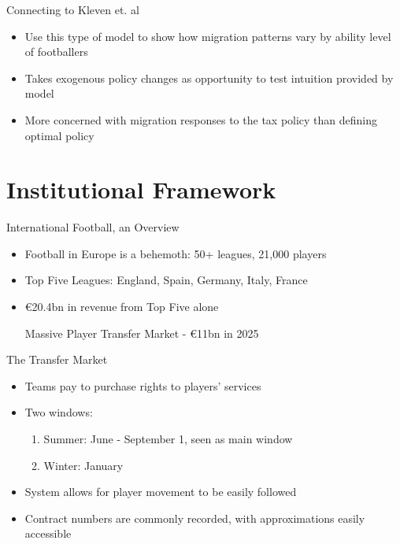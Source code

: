 \documentclass[aspectratio=169,professionalfonts]{beamer}
\begin{document}
\begin{frame}{Connecting to Kleven et. al}
  \begin{itemize}
    \item Use this type of model to show how migration patterns vary by ability level of footballers
    \item Takes exogenous policy changes as opportunity to test intuition provided by model
    \item More concerned with migration responses to the tax policy than defining optimal policy
  \end{itemize}
\end{frame}

\section{Institutional Framework}

\begin{frame}{International Football, an Overview}
  \begin{itemize}
    \item Football in Europe is a behemoth: 50+ leagues, 21,000 players
    \item Top Five Leagues: England, Spain, Germany, Italy, France
    \item \euro 20.4bn in revenue from Top Five alone
    \begin{tcolorbox}[colback=red!5!white,colframe=red!75!black]
      Massive Player Transfer Market - \euro 11bn in 2025
    \end{tcolorbox}
  \end{itemize}
\end{frame}

\begin{frame}{The Transfer Market}
  \begin{itemize}
    \item Teams pay to purchase rights to players' services
    \item Two windows:
    \begin{enumerate}
      \item Summer: June - September 1, seen as main window
      \item Winter: January
    \end{enumerate}
    \item System allows for player movement to be easily followed
    \item Contract numbers are commonly recorded, with approximations easily accessible
  \end{itemize}
\end{frame}
\end{document}
